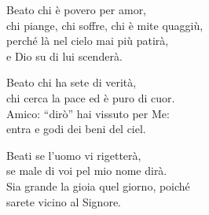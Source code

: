 
\strofa Beato chi è povero per amor,\\
chi piange, chi soffre, chi è mite quaggiù,\\
perché là nel cielo mai più patirà,\\
e Dio su di lui scenderà.

\spazio

\strofa Beato chi ha sete di verità,\\
chi cerca la pace ed è puro di cuor.\\
Amico: ``dirò'' hai vissuto per Me:\\
entra e godi dei beni del ciel.

\spazio

\strofa Beati se l'uomo vi rigetterà,\\
se male di voi pel mio nome dirà.\\
Sia grande la gioia quel giorno, poiché\\
sarete vicino al Signore.